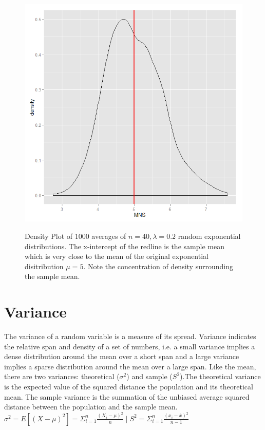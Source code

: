 \documentclass[11pt]{article} %
\begin{document}
\begin{figure}
  \centering
\caption{\footnotesize Density Plot of 1000 averages of $n = 40, \lambda = 0.2$ random exponential distributions. The x-intercept of the redline is the sample mean which is very close to the mean of the original exponential disitribution $\mu = 5$. Note the concentration of density surrounding the sample mean.}
  \includegraphics[scale = 0.45]{figure1}
	\label{Figure 1.}
\end{figure}

\section{Variance}
	The variance of a random variable is a measure of its spread. Variance indicates the relative span and density of a set of numbers, i.e. a small variance implies a dense distribution around the mean over a short span and a large variance implies a sparse distribution around the mean over a large span.  Like the mean, there are two variances: theoretical ($\sigma^2$) and sample ($S^2$).The theoretical variance is the expected value of the squared distance the population and its theoretical mean. 
The sample variance is the summation of the unbiased average squared distance between the population and the sample mean. 
{\center
	$\sigma^2 = E[(X - \mu)^2] = \Sigma_{i = 1}^{n}{\frac{(X_i - \mu)^2}{n}} \mid S^2 = \Sigma_{i = 1}^{n}{\frac{(x_i - \bar{x})^2}{n - 1}}$
}
\end{document}
